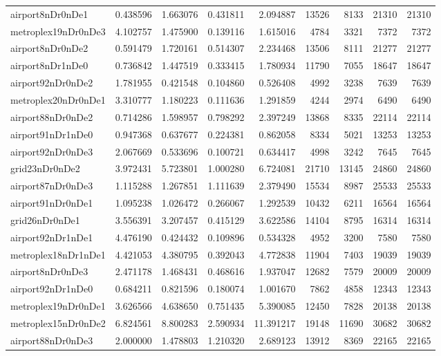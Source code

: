 \begin{longtable}{|l|r|r|r|r|r|r|r|r|}
airport8nDr0nDe1 & 0.438596 & 1.663076 & 0.431811 & 2.094887 & 13526 & 8133 & 21310 & 21310 \\
metroplex19nDr0nDe3 & 4.102757 & 1.475900 & 0.139116 & 1.615016 & 4784 & 3321 & 7372 & 7372 \\
airport8nDr0nDe2 & 0.591479 & 1.720161 & 0.514307 & 2.234468 & 13506 & 8111 & 21277 & 21277 \\
airport8nDr1nDe0 & 0.736842 & 1.447519 & 0.333415 & 1.780934 & 11790 & 7055 & 18647 & 18647 \\
airport92nDr0nDe2 & 1.781955 & 0.421548 & 0.104860 & 0.526408 & 4992 & 3238 & 7639 & 7639 \\
metroplex20nDr0nDe1 & 3.310777 & 1.180223 & 0.111636 & 1.291859 & 4244 & 2974 & 6490 & 6490 \\
airport88nDr0nDe2 & 0.714286 & 1.598957 & 0.798292 & 2.397249 & 13868 & 8335 & 22114 & 22114 \\
airport91nDr1nDe0 & 0.947368 & 0.637677 & 0.224381 & 0.862058 & 8334 & 5021 & 13253 & 13253 \\
airport92nDr0nDe3 & 2.067669 & 0.533696 & 0.100721 & 0.634417 & 4998 & 3242 & 7645 & 7645 \\
grid23nDr0nDe2 & 3.972431 & 5.723801 & 1.000280 & 6.724081 & 21710 & 13145 & 24860 & 24860 \\
airport87nDr0nDe3 & 1.115288 & 1.267851 & 1.111639 & 2.379490 & 15534 & 8987 & 25533 & 25533 \\
airport91nDr0nDe1 & 1.095238 & 1.026472 & 0.266067 & 1.292539 & 10432 & 6211 & 16564 & 16564 \\
grid26nDr0nDe1 & 3.556391 & 3.207457 & 0.415129 & 3.622586 & 14104 & 8795 & 16314 & 16314 \\
airport92nDr1nDe1 & 4.476190 & 0.424432 & 0.109896 & 0.534328 & 4952 & 3200 & 7580 & 7580 \\
metroplex18nDr1nDe1 & 4.421053 & 4.380795 & 0.392043 & 4.772838 & 11904 & 7403 & 19039 & 19039 \\
airport8nDr0nDe3 & 2.471178 & 1.468431 & 0.468616 & 1.937047 & 12682 & 7579 & 20009 & 20009 \\
airport92nDr1nDe0 & 0.684211 & 0.821596 & 0.180074 & 1.001670 & 7862 & 4858 & 12343 & 12343 \\
metroplex19nDr0nDe1 & 3.626566 & 4.638650 & 0.751435 & 5.390085 & 12450 & 7828 & 20138 & 20138 \\
metroplex15nDr0nDe2 & 6.824561 & 8.800283 & 2.590934 & 11.391217 & 19148 & 11690 & 30682 & 30682 \\
airport88nDr0nDe3 & 2.000000 & 1.478803 & 1.210320 & 2.689123 & 13912 & 8369 & 22165 & 22165 \\

\end{longtable}
